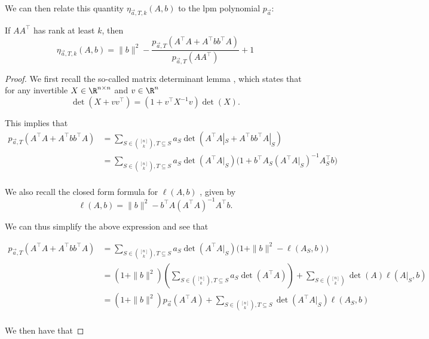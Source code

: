We can then relate this quantity $\eta_{\vec{a}, T, k}(A, b)$ to the lpm polynomial $p_{\vec{a}}$:
\begin{theorem}
    If $AA^{\intercal}$ has rank at least $k$, then
\[
     \eta_{\vec{a}, T, k}(A,b) =
     \|b\|^2 - \frac{p_{\vec{a}, T}(A^{\intercal}A + A^{\intercal}bb^{\intercal}A)}{p_{\vec{a}, T}(AA^{\intercal})} + 1
 \]
\end{theorem}
\begin{proof}
    We first recall the so-called matrix determinant lemma \cite{TODO}, which states that for any invertible $X \in \R^{n\times n }$ and $v \in \R^{n}$
    \[
        \det(X + vv^{\intercal}) = (1+v^{\intercal}X^{-1}v)\det(X).
    \]

    This implies that
    \begin{align*}
        p_{\vec{a}, T}(A^{\intercal}A + A^{\intercal}bb^{\intercal}A) &= \sum_{S \in \binom{[n]}{k}, T \subseteq S} a_S\det(A^{\intercal}A|_S + A^{\intercal}bb^{\intercal}A|_S)\\
                                                                   &= \sum_{S \in \binom{[n]}{k}, T \subseteq S} a_S\det(A^{\intercal}A|_S)\big(1+b^{\intercal}A_S(A^{\intercal}A|_S)^{-1}A_S^{\intercal}b\big)\\
    \end{align*}

    We also recall the closed form formula for $\ell(A,b)$ \cite{TODO}, given by
    \[
        \ell(A,b) = \|b\|^2 - b^{\intercal}A(A^{\intercal}A)^{-1}A^{\intercal}b.
    \]

    We can thus simplify the above expression and see that

    \begin{align*}
        p_{\vec{a}, T}(A^{\intercal}A + A^{\intercal}bb^{\intercal}A) &= \sum_{S \in \binom{[n]}{k}, T \subseteq S} a_S\det(A^{\intercal}A|_S)\big(1+\|b\|^2-\ell(A_S,b)\big)\\
                                                                   &= (1+\|b\|^2)\left( \sum_{S \in \binom{[n]}{k}, T \subseteq S} a_S\det(A^{\intercal}A) \right) + \sum_{S \in \binom{[n]}{k}}\det(A)\ell(A|_S,b)\\
                                                                   &= (1+\|b\|^2)p_{\vec{a}}(A^{\intercal}A) + \sum_{S \in \binom{[n]}{k}, T \subseteq S}\det(A^{\intercal}A|_S)\ell(A_S,b)\\
    \end{align*}

    We then have that


\end{proof}

